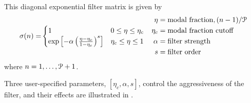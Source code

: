 This diagonal exponential filter matrix is given by\cite{Hesthaven_2010}
\begin{align}
    \label{EQN:ExpFilterMatrix}
    \sigma (n)
 =& \begin{cases}
       1
    &  0 \leq \eta \leq \eta_c
    \\
       \exp \left[ -\alpha \left( \frac{\eta-\eta_c}{1-\eta_c} \right)^s
            \right]
    &  \eta_c \leq \eta \leq 1
    \end{cases}
  &
    \begin{aligned}
       \eta   = & \;\text{modal fraction}, (n-1) / {\cal P}
    \\ \eta_c = & \;\text{modal fraction cutoff}
    \\ \alpha = & \;\text{filter strength}
    \\ s      = & \;\text{filter order}
    \end{aligned}
\end{align}
%
where $n=1,\ldots,{\cal P}+1$.




Three user-specified parameters, $[\eta_c, \alpha, s]$, control the
aggressiveness of the filter, and their effects are illustrated in
.\\[12pt]


